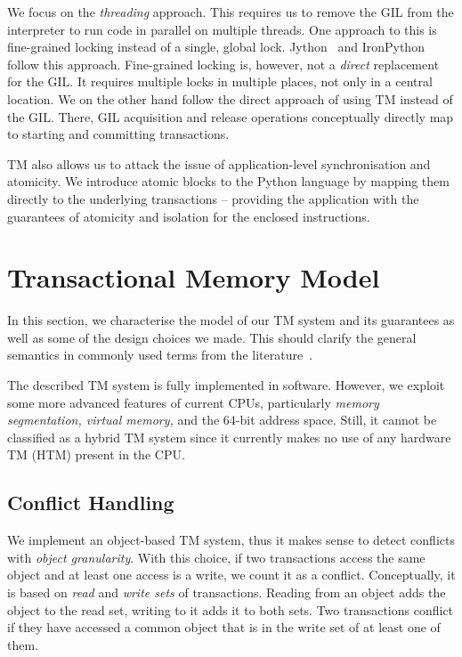 \documentclass{sigplanconf}
\begin{document}
We focus on the \emph{threading} approach. This requires us to remove
the GIL from the interpreter to run code in parallel on multiple
threads. One approach to this is fine-grained locking instead of a
single, global lock. Jython~\cite{webjython} and
IronPython~\cite{ironpython} follow this approach. Fine-grained
locking is, however, not a \emph{direct} replacement for the GIL. It
requires multiple locks in multiple places, not only in a central
location. We on the other hand follow the direct approach of using TM
instead of the GIL. There, GIL acquisition and release operations
conceptually directly map to starting and committing transactions.

TM also allows us to attack the issue of application-level
synchronisation and atomicity. We introduce atomic blocks to the
Python language by mapping them directly to the underlying
transactions -- providing the application with the guarantees of
atomicity and isolation for the enclosed instructions.


\section{Transactional Memory Model}

In this section, we characterise the model of our TM system and its
guarantees as well as some of the design choices we made. This should
clarify the general semantics in commonly used terms from the
literature~\cite{harris10}.

The described TM system is fully implemented in software. However, we exploit
some more advanced features of current CPUs, particularly \emph{memory
segmentation, virtual memory,} and the 64-bit address space. Still,
it cannot be classified as a hybrid TM system since it currently
makes no use of any hardware TM (HTM) present in the CPU.

\subsection{Conflict Handling}

We implement an object-based TM system, thus it makes sense to detect
conflicts with \emph{object granularity}. With this choice, if two
transactions access the same object and at least one access is a
write, we count it as a conflict. Conceptually, it is based on
\emph{read} and \emph{write sets} of transactions. Reading from an
object adds the object to the read set, writing to it adds it to both
sets. Two transactions conflict if they have accessed a common object
that is in the write set of at least one of them.
\end{document}
